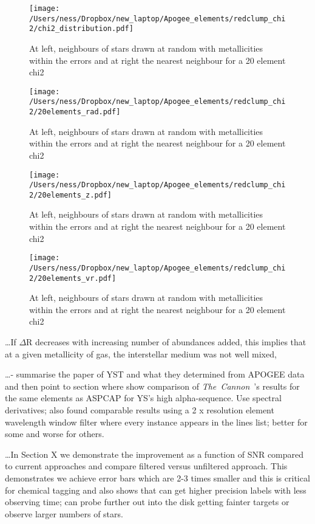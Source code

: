 \documentclass[12pt, preprint]{aastex}
\newcommand{\project}[1]{\textsl{#1}}
\newcommand{\tc}{\project{The~Cannon}}
\begin{document}
\begin{figure}
\centering
\flushleft
  \texttt{[image: /Users/ness/Dropbox/new\_laptop/Apogee\_elements/redclump\_chi2/chi2\_distribution.pdf]}
    \caption{ At left, neighbours of stars drawn at random with metallicities within the errors and at right the nearest neighbour for a 20 element chi2 }
\label{fig:cn}
\end{figure}

\begin{figure}
\centering
\flushleft
  \texttt{[image: /Users/ness/Dropbox/new\_laptop/Apogee\_elements/redclump\_chi2/20elements\_rad.pdf]}
    \caption{ At left, neighbours of stars drawn at random with metallicities within the errors and at right the nearest neighbour for a 20 element chi2 }
\label{fig:cn}
\end{figure}


\begin{figure}
\centering
\flushleft
  \texttt{[image: /Users/ness/Dropbox/new\_laptop/Apogee\_elements/redclump\_chi2/20elements\_z.pdf]}
    \caption{ At left, neighbours of stars drawn at random with metallicities within the errors and at right the nearest neighbour for a 20 element chi2 }
\label{fig:cn}
\end{figure}


\begin{figure}
\centering
\flushleft
  \texttt{[image: /Users/ness/Dropbox/new\_laptop/Apogee\_elements/redclump\_chi2/20elements\_vr.pdf]}
    \caption{ At left, neighbours of stars drawn at random with metallicities within the errors and at right the nearest neighbour for a 20 element chi2 }
\label{fig:cn}
\end{figure}

\ldots If $\Delta$R decreases with increasing number of abundances added, this implies that at a given metallicity of gas, the interstellar medium was not well mixed, 

\ldots - summarise the paper of YST and what they determined from APOGEE data and then point to section where show comparison of \tc\  's results for the same elements as ASPCAP for YS's high alpha-sequence.
Use spectral derivatives; also found comparable results using a 2 x resolution element wavelength window filter where every instance appears in the lines list; better for some and worse for others. 

\ldots In Section X we demonstrate the improvement as a function of SNR compared to current approaches and compare filtered versus unfiltered approach. This demonstrates we achieve error bars which are 2-3 times smaller and this is critical for chemical tagging and also shows that can get higher precision labels with less observing time; can probe further out into the disk getting fainter targets or observe larger numbers of stars. 
 
\end{document}
